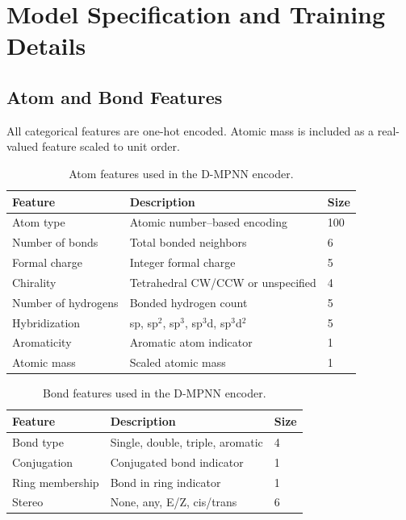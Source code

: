 \setcounter{table}{0}
\renewcommand{\thetable}{S\arabic{table}}

\setcounter{figure}{0}
\renewcommand{\thefigure}{S\arabic{figure}}

\section{Model Specification and Training Details}

\subsection{Atom and Bond Features}
All categorical features are one-hot encoded. Atomic mass is included as a real-valued feature scaled to unit order.
\begin{table}[ht]
\centering
\caption{Atom features used in the D-MPNN encoder.}
\label{tab:atom-features}
\begin{tabular}{lll}
\toprule
\textbf{Feature} & \textbf{Description} & \textbf{Size} \\
\midrule
Atom type & Atomic number–based encoding & 100 \\
Number of bonds & Total bonded neighbors & 6 \\
Formal charge & Integer formal charge & 5 \\
Chirality & Tetrahedral CW/CCW or unspecified & 4 \\
Number of hydrogens & Bonded hydrogen count & 5 \\
Hybridization & sp, sp$^2$, sp$^3$, sp$^3$d, sp$^3$d$^2$ & 5 \\
Aromaticity & Aromatic atom indicator & 1 \\
Atomic mass & Scaled atomic mass & 1 \\
\bottomrule
\end{tabular}
\end{table}

\begin{table}[ht]
\centering
\caption{Bond features used in the D-MPNN encoder.}
\label{tab:bond-features}
\begin{tabular}{lll}
\toprule
\textbf{Feature} & \textbf{Description} & \textbf{Size} \\
\midrule
Bond type & Single, double, triple, aromatic & 4 \\
Conjugation & Conjugated bond indicator & 1 \\
Ring membership & Bond in ring indicator & 1 \\
Stereo & None, any, E/Z, cis/trans & 6 \\
\bottomrule
\end{tabular}
\end{table}

